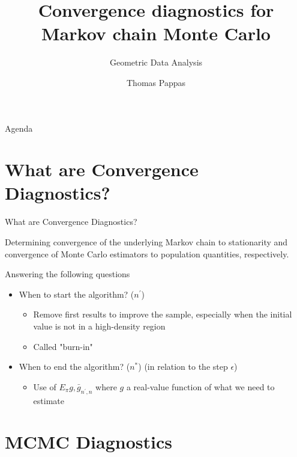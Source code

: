 \documentclass{beamer}
\begin{document}
\title{Convergence diagnostics for Markov chain Monte Carlo}
\subtitle{Geometric Data Analysis}
\author{Thomas Pappas}
\maketitle

\begin{frame}{Agenda}
  \tableofcontents[hideallsubsections]
\end{frame}

\section{What are Convergence Diagnostics?}

\begin{frame}{What are Convergence Diagnostics?}
  \begin{block}{}
    Determining convergence of the underlying Markov chain to stationarity and convergence of Monte Carlo estimators to population quantities, respectively.
  \end{block}
  \begin{block}{Answering the following questions}
    \begin{itemize}
      \item When to start the algorithm? ($n^\prime$)
        \begin{itemize}
          \item Remove first results to improve the sample, especially when the initial value is not in a high-density region
          \item Called "burn-in"
        \end{itemize}
      \item When to end the algorithm? ($n^*$) (in relation to the step $\epsilon$)
        \begin{itemize}
          \item Use of $E_\pi g, \bar{g}_{n^\prime,n}$ where $g$ a real-value function of what we need to estimate
        \end{itemize}
    \end{itemize}
  \end{block}
\end{frame}

\section{MCMC Diagnostics}
\end{document}
